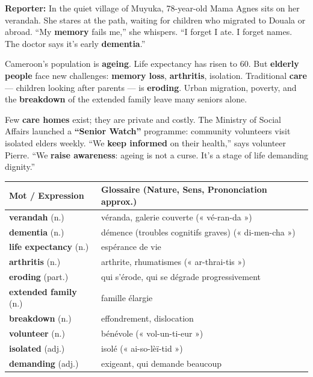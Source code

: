\documentclass[11pt]{article}
\begin{document}
\begin{textebox}
\textbf{Reporter:} In the quiet village of Muyuka, 78-year-old Mama Agnes sits on her verandah. She stares at the path, waiting for children who migrated to Douala or abroad. “My \textbf{memory} fails me,” she whispers. “I forget I ate. I forget names. The doctor says it’s early \textbf{dementia}.”

Cameroon’s population is \textbf{ageing}. Life expectancy has risen to 60. But \textbf{elderly people} face new challenges: \textbf{memory loss}, \textbf{arthritis}, isolation. Traditional \textbf{care} — children looking after parents — is \textbf{eroding}. Urban migration, poverty, and the \textbf{breakdown} of the extended family leave many seniors alone.

Few \textbf{care homes} exist; they are private and costly. The Ministry of Social Affairs launched a \textbf{“Senior Watch”} programme: community volunteers visit isolated elders weekly. “We \textbf{keep informed} on their health,” says volunteer Pierre. “We \textbf{raise awareness}: ageing is not a curse. It’s a stage of life demanding dignity.”
\end{textebox}

\begin{center}
\begin{tabularx}{\linewidth}{|l|X|}
\hline
\rowcolor{popblueL} \textbf{Mot / Expression} & \textbf{Glossaire (Nature, Sens, Prononciation approx.)} \\
\hline
\textbf{verandah} (n.) & véranda, galerie couverte (« vé-ran-da ») \\
\textbf{dementia} (n.) & démence (troubles cognitifs graves) (« di-men-cha ») \\
\textbf{life expectancy} (n.) & espérance de vie \\
\textbf{arthritis} (n.) & arthrite, rhumatismes (« ar-thrai-tis ») \\
\textbf{eroding} (part.) & qui s'érode, qui se dégrade progressivement \\
\textbf{extended family} (n.) & famille élargie \\
\textbf{breakdown} (n.) & effondrement, dislocation \\
\textbf{volunteer} (n.) & bénévole (« vol-un-ti-eur ») \\
\textbf{isolated} (adj.) & isolé (« ai-so-lèï-tid ») \\
\textbf{demanding} (adj.) & exigeant, qui demande beaucoup \\
\hline
\end{tabularx}
\end{center}
\end{document}
